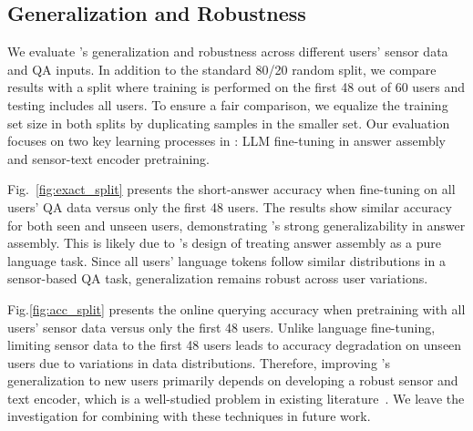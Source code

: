 \subsection{Generalization and Robustness}
\label{sec:generalizability}
We evaluate \Method's generalization and robustness across different users' sensor data and QA inputs. In addition to the standard 80/20 random split, we compare results with a split where training is performed on the first 48 out of 60 users and testing includes all users. To ensure a fair comparison, we equalize the training set size in both splits by duplicating samples in the smaller set.
Our evaluation focuses on two key learning processes in \Method: LLM fine-tuning in answer assembly and sensor-text encoder pretraining.

Fig.~\ref{fig:exact_split} presents the short-answer accuracy when fine-tuning on all users' QA data versus only the first 48 users. The results show similar accuracy for both seen and unseen users, demonstrating \Method's strong generalizability in answer assembly. This is likely due to \Method's design of treating answer assembly as a pure language task. Since all users' language tokens follow similar distributions in a sensor-based QA task, generalization remains robust across user variations.

Fig.\ref{fig:acc_split} presents the online querying accuracy when pretraining with all users' sensor data versus only the first 48 users. Unlike language fine-tuning, limiting sensor data to the first 48 users leads to accuracy degradation on unseen users due to variations in data distributions. Therefore, improving \Method's generalization to new users primarily depends on developing a robust sensor and text encoder, which is a well-studied problem in existing literature~\cite{xu2023practically}. We leave the investigation for combining with these techniques in future work.
